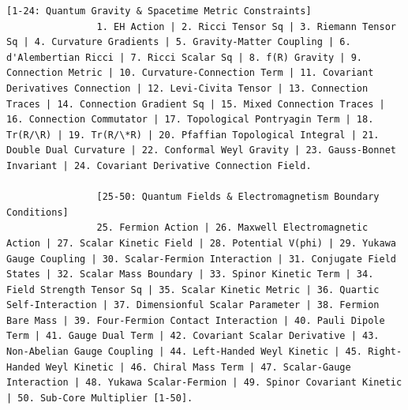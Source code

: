 \documentclass[13pt,a4paper]{ltjsarticle}
\begin{document}
\begin{tcolorbox}
\begin{lstlisting}[basicstyle=\scriptsize\ttfamily, breaklines=true, columns=fullflexible]
				[1-24: Quantum Gravity & Spacetime Metric Constraints]
				1. EH Action | 2. Ricci Tensor Sq | 3. Riemann Tensor Sq | 4. Curvature Gradients | 5. Gravity-Matter Coupling | 6. d'Alembertian Ricci | 7. Ricci Scalar Sq | 8. f(R) Gravity | 9. Connection Metric | 10. Curvature-Connection Term | 11. Covariant Derivatives Connection | 12. Levi-Civita Tensor | 13. Connection Traces | 14. Connection Gradient Sq | 15. Mixed Connection Traces | 16. Connection Commutator | 17. Topological Pontryagin Term | 18. Tr(R/\R) | 19. Tr(R/\*R) | 20. Pfaffian Topological Integral | 21. Double Dual Curvature | 22. Conformal Weyl Gravity | 23. Gauss-Bonnet Invariant | 24. Covariant Derivative Connection Field.
				
				[25-50: Quantum Fields & Electromagnetism Boundary Conditions]
				25. Fermion Action | 26. Maxwell Electromagnetic Action | 27. Scalar Kinetic Field | 28. Potential V(phi) | 29. Yukawa Gauge Coupling | 30. Scalar-Fermion Interaction | 31. Conjugate Field States | 32. Scalar Mass Boundary | 33. Spinor Kinetic Term | 34. Field Strength Tensor Sq | 35. Scalar Kinetic Metric | 36. Quartic Self-Interaction | 37. Dimensionful Scalar Parameter | 38. Fermion Bare Mass | 39. Four-Fermion Contact Interaction | 40. Pauli Dipole Term | 41. Gauge Dual Term | 42. Covariant Scalar Derivative | 43. Non-Abelian Gauge Coupling | 44. Left-Handed Weyl Kinetic | 45. Right-Handed Weyl Kinetic | 46. Chiral Mass Term | 47. Scalar-Gauge Interaction | 48. Yukawa Scalar-Fermion | 49. Spinor Covariant Kinetic | 50. Sub-Core Multiplier [1-50].
				

\end{lstlisting}
\end{tcolorbox}
\end{document}
